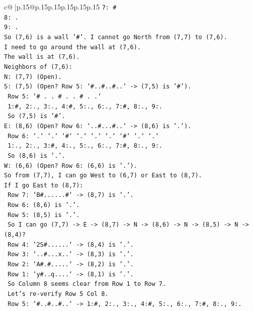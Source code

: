 \documentclass{article}
\begin{document}
{\begin{supertabular}{c@{$\;$}|p{.15\linewidth}@{}p{.15\linewidth}p{.15\linewidth}p{.15\linewidth}p{.15\linewidth}p{.15\linewidth}}
{{{\texttt{7: \#} \\
\texttt{8: .} \\
\texttt{9: .} \\
\texttt{So (7,6) is a wall '\#'. I cannot go North from (7,7) to (7,6).} \\
\texttt{I need to go around the wall at (7,6).} \\
\texttt{The wall is at (7,6).} \\
\texttt{Neighbors of (7,6):} \\
\texttt{N: (7,7) (Open).} \\
\texttt{S: (7,5) (Open? Row 5: `\#..\#..\#..` {-}> (7,5) is '\#').} \\
\texttt{   Row 5: `\# . . \# . . \# . .`} \\
\texttt{   1:\#, 2:., 3:., 4:\#, 5:., 6:., 7:\#, 8:., 9:.} \\
\texttt{   So (7,5) is '\#'.} \\
\texttt{E: (8,6) (Open? Row 6: `..\#...\#..` {-}> (8,6) is '.').} \\
\texttt{   Row 6: `.` `.` `\#` `.` `.` `.` `\#` `.` `.`} \\
\texttt{   1:., 2:., 3:\#, 4:., 5:., 6:., 7:\#, 8:., 9:.} \\
\texttt{   So (8,6) is '.'.} \\
\texttt{W: (6,6) (Open? Row 6: (6,6) is '.').} \\
\texttt{So from (7,7), I can go West to (6,7) or East to (8,7).} \\
\texttt{If I go East to (8,7):} \\
\texttt{   Row 7: `B\#......\#` {-}> (8,7) is '.'.} \\
\texttt{   Row 6: (8,6) is '.'.} \\
\texttt{   Row 5: (8,5) is '.'.} \\
\texttt{   So I can go (7,7) {-}> E {-}> (8,7) {-}> N {-}> (8,6) {-}> N {-}> (8,5) {-}> N {-}> (8,4)?} \\
\texttt{   Row 4: `2S\#......` {-}> (8,4) is '.'.} \\
\texttt{   Row 3: `..\#...x..` {-}> (8,3) is '.'.} \\
\texttt{   Row 2: `A\#.\#.....` {-}> (8,2) is '.'.} \\
\texttt{   Row 1: `y\#..q....` {-}> (8,1) is '.'.} \\
\texttt{   So Column 8 seems clear from Row 1 to Row 7.} \\
\texttt{   Let's re{-}verify Row 5 Col 8.} \\
\texttt{   Row 5: `\#..\#..\#..` {-}> 1:\#, 2:., 3:., 4:\#, 5:., 6:., 7:\#, 8:., 9:.} \\
}}}
\end{supertabular}}
\end{document}
